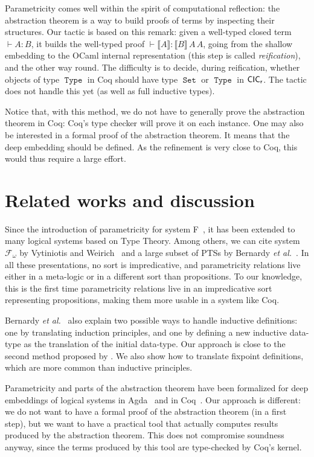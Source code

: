 \documentclass[a4paper,USenglish]{lipics}
\DeclareMathOperator{\Type}{\mathtt{Type}}
\DeclareMathOperator{\Set}{\mathtt{Set}}
\def\coq{\textsf{Coq}\xspace}
\def\cicr{$\text{\textsf{CIC}}_{\text{\textsf{r}}}$\xspace}
\def\agda{\textsf{Agda}\xspace}
\def\ocaml{\textsf{OCaml}\xspace}
\newcommand{\Fw}{\mathcal{F}_ω}
\begin{document}
Parametricity comes well within the spirit of computational reflection:
the abstraction theorem is a way to build proofs of terms by inspecting
their structures. Our tactic is based on this remark: given a well-typed
closed term $\vdash A : B$, it builds the well-typed proof $\vdash
\llbracket A \rrbracket : \llbracket B \rrbracket\,A\,A$, going from the
shallow embedding to the \ocaml internal representation (this step is
called \emph{reification}), and the other way round. The difficulty is
to decide, during reification, whether objects of type $\Type$ in \coq
should have type $\Set$ or $\Type$ in \cicr. The tactic does not handle
this yet (as well as full inductive types).

Notice that, with this method, we do not have to generally prove the
abstraction theorem in \coq: \coq's type checker will prove it on each
instance. One may also be interested in a formal proof of the abstraction
theorem. It means that the deep embedding should be defined. As the
refinement is very close to \coq, this would thus require a large
effort.


\section{Related works and discussion}

Since the introduction of parametricity for system
F~\cite{DBLP:conf/ifip/Reynolds83,Wadler89}, it has been
extended to many logical systems based on Type Theory. Among others, we
can cite system $\Fw$ by Vytiniotis and
Weirich~\cite{VytiniotisW10} and a large subset of PTSs by
Bernardy \emph{et al.}~\cite{DBLP:conf/icfp/BernardyJP10,DBLP:conf/fossacs/BernardyL11}.
In all these presentations, no sort is impredicative, and parametricity
relations live either in a meta-logic or in a different sort than
propositions. To our knowledge, this is the first time parametricity
relations live in an impredicative sort representing propositions,
making them more usable in a system like \coq.

Bernardy \emph{et al.}~\cite{DBLP:conf/icfp/BernardyJP10} also explain two possible ways to
handle inductive definitions: one by translating induction principles,
and one by defining a new inductive data-type as the translation of the
initial data-type. Our approach is close to the second method proposed
by \cite{DBLP:conf/icfp/BernardyJP10}. We also show how to translate
fixpoint definitions, which are more common than inductive principles.

Parametricity and parts of the abstraction theorem have been formalized
for deep embeddings of logical systems in
\agda~\cite{DBLP:conf/icfp/BernardyJP10} and in
\coq~\cite{DBLP:conf/tlca/Atkey09,Atkey09b}. Our approach is different:
we do not want to have a formal proof of the abstraction theorem (in a
first step), but we want to have a practical tool that actually computes
results produced by the abstraction theorem. This does not compromise
soundness anyway, since the terms produced by this tool are type-checked
by \coq's kernel.
\end{document}
